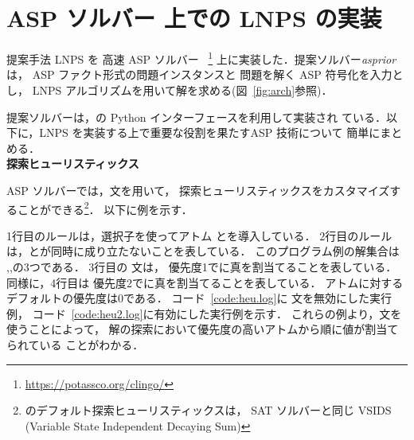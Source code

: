 \chapter{ASP ソルバー 上での LNPS の実装}
%
提案手法 LNPS を 高速 ASP ソルバー
{\clingo}~\footnote{\url{https://potassco.org/clingo/}}
上に実装した．提案ソルバー\textit{asprior}は，
ASP ファクト形式の問題インスタンスと
問題を解く ASP 符号化を入力とし，
LNPS アルゴリズムを用いて解を求める(図~\ref{fig:arch}参照)．
%


提案ソルバーは，{\clingo}の Python インターフェースを利用して実装され
ている．以下に，LNPS を実装する上で重要な役割を果たすASP 技術について
簡単にまとめる．\\

\textbf{探索ヒューリスティックス}

ASP ソルバー{\clingo}では，文を用いて，
探索ヒューリスティックスをカスタマイズすることができる\footnote{%
{\clingo}のデフォルト探索ヒューリスティックスは，
SAT ソルバーと同じ VSIDS (Variable State Independent Decaying Sum)}．
以下に例を示す．



1行目のルールは，選択子を使ってアトム
とを導入している．
2行目のルールは，とが同時に成り立たないことを表している．
このプログラム例の解集合は
\code{\{\}},,の3つである．
3行目の 文は，
優先度1でに真を割当てることを表している．
同様に，4行目は
優先度2でに真を割当てることを表している．
アトムに対するデフォルトの優先度は0である．
%
コード~\ref{code:heu.log}に 文を無効にした実行例，
コード~\ref{code:heu2.log}に有効にした実行例を示す．
これらの例より，文を使うことによって，
解の探索において優先度の高いアトムから順に値が割当てられている
ことがわかる．




